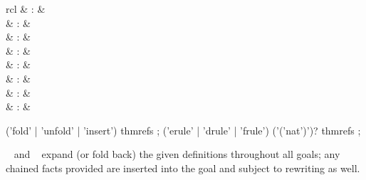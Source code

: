 \begin{isabellebody}
\begin{isamarkuptext}
\begin{descr}
  \end{descr}%
\end{isamarkuptext}%
\isamarkuptrue%
%
\isamarkuptrue%
%
\isamarkuptrue%
%
\begin{isamarkuptext}%
\begin{matharray}{rcl}
    \hypertarget{method.unfold}{\hyperlink{method.unfold}{\mbox{}}} & : & \isarmeth \\
    \hypertarget{method.fold}{\hyperlink{method.fold}{\mbox{}}} & : & \isarmeth \\
    \hypertarget{method.insert}{\hyperlink{method.insert}{\mbox{}}} & : & \isarmeth \\[0.5ex]
    \hypertarget{method.erule}{\hyperlink{method.erule}{\mbox{}}}\isa{{\isachardoublequote}\isactrlsup {\isacharasterisk}{\isachardoublequote}} & : & \isarmeth \\
    \hypertarget{method.drule}{\hyperlink{method.drule}{\mbox{}}}\isa{{\isachardoublequote}\isactrlsup {\isacharasterisk}{\isachardoublequote}} & : & \isarmeth \\
    \hypertarget{method.frule}{\hyperlink{method.frule}{\mbox{}}}\isa{{\isachardoublequote}\isactrlsup {\isacharasterisk}{\isachardoublequote}} & : & \isarmeth \\
    \hypertarget{method.succeed}{\hyperlink{method.succeed}{\mbox{}}} & : & \isarmeth \\
    \hypertarget{method.fail}{\hyperlink{method.fail}{\mbox{}}} & : & \isarmeth \\
  \end{matharray}

  \begin{rail}
    ('fold' | 'unfold' | 'insert') thmrefs
    ;
    ('erule' | 'drule' | 'frule') ('('nat')')? thmrefs
    ;
  \end{rail}

  \begin{descr}
  
  \item [\hyperlink{method.unfold}{\mbox{\isa{unfold}}}~\isa{{\isachardoublequote}a\isactrlsub {\isadigit{1}}\ {\isasymdots}\ a\isactrlsub n{\isachardoublequote}} and \hyperlink{method.fold}{\mbox{\isa{fold}}}~\isa{{\isachardoublequote}a\isactrlsub {\isadigit{1}}\ {\isasymdots}\ a\isactrlsub n{\isachardoublequote}}] expand (or fold back) the
  given definitions throughout all goals; any chained facts provided
  are inserted into the goal and subject to rewriting as well.


\end{descr}
\end{isamarkuptext}
\end{isabellebody}
